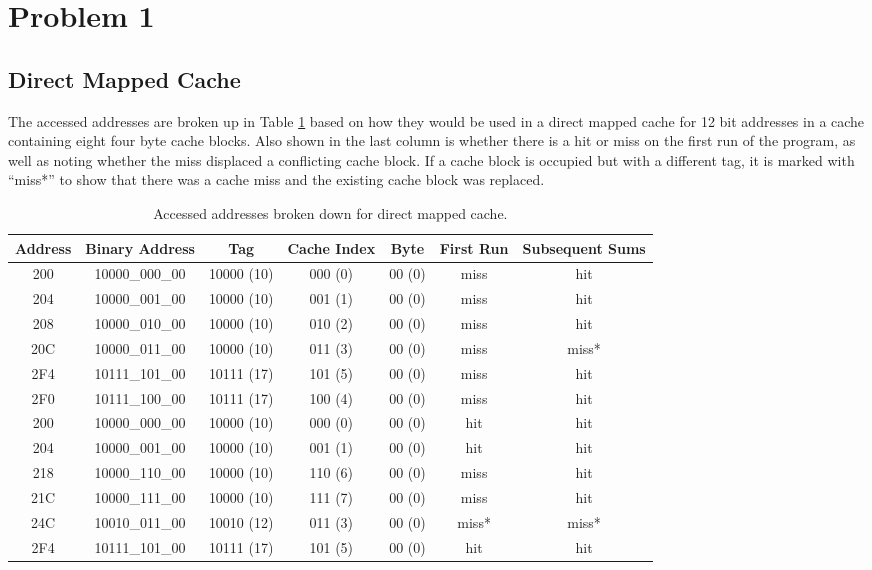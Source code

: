 \documentclass[12pt,letterpaper]{article}
\begin{document}
\section*{Problem 1}

\subsection*{Direct Mapped Cache}

The accessed addresses are broken up in Table \ref{table:diradd} based on how they would be used in a
direct mapped cache for 12 bit addresses in a cache containing eight four byte cache blocks. Also
shown in the last column is whether there is a hit or miss on the first run of the program, as well
as noting whether the miss displaced a conflicting cache block. If a cache block is occupied but
with a different tag, it is marked with ``miss*'' to show that there was a cache miss and the
existing cache block was replaced.

\begin{table}[h!]
\centering
\begin{tabular}{c|c|c|c|c|c|c}
Address & Binary Address & Tag & Cache Index & Byte& First Run & Subsequent Sums\\
\hline
200 &   10000\_000\_00 &   10000 (10) & 000 (0) & 00 (0) & miss & hit \\
204 &   10000\_001\_00 &   10000 (10) & 001 (1) & 00 (0) & miss & hit \\
208 &   10000\_010\_00 &   10000 (10) & 010 (2) & 00 (0) & miss & hit \\
20C &   10000\_011\_00 &   10000 (10) & 011 (3) & 00 (0) & miss & miss* \\
2F4 &   10111\_101\_00 &   10111 (17) & 101 (5) & 00 (0) & miss & hit \\
2F0 &   10111\_100\_00 &   10111 (17) & 100 (4) & 00 (0) & miss & hit \\
200 &   10000\_000\_00 &   10000 (10) & 000 (0) & 00 (0) & hit  & hit \\
204 &   10000\_001\_00 &   10000 (10) & 001 (1) & 00 (0) & hit  & hit \\
218 &   10000\_110\_00 &   10000 (10) & 110 (6) & 00 (0) & miss & hit \\
21C &   10000\_111\_00 &   10000 (10) & 111 (7) & 00 (0) & miss & hit \\
24C &   10010\_011\_00 &   10010 (12) & 011 (3) & 00 (0) & miss*& miss* \\
2F4 &   10111\_101\_00 &   10111 (17) & 101 (5) & 00 (0) & hit  & hit
\end{tabular}
\caption{Accessed addresses broken down for direct mapped cache.}
\label{table:diradd}
\end{table}
\end{document}
